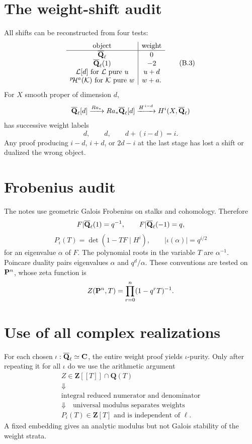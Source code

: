\section{The weight-shift audit}

All shifts can be reconstructed from four tests:
\[
\begin{array}{c|c}
\text{object}&\text{weight}\\
\hline
\overline{\mathbf Q}_\ell&0\\
\overline{\mathbf Q}_\ell(1)&-2\\
\mathcal L[d]\text{ for \(\mathcal L\) pure \(u\)}&u+d\\
{}^{p}\!\mathcal H^a(\mathcal K)\text{ for \(\mathcal K\) pure \(w\)}&w+a.
\end{array}
\tag{B.3}\label{eq:weight-shift-audit}
\]
For \(X\) smooth proper of dimension \(d\),
\[
  \overline{\mathbf Q}_\ell[d]\xrightarrow{Ra_*}
  Ra_*\overline{\mathbf Q}_\ell[d]
\xrightarrow{H^{\,i-d}}
  H^i(X,\overline{\mathbf Q}_\ell)
\]
has successive weight labels
\[
  d,\qquad d,\qquad d+(i-d)=i.
\tag{B.4}\label{eq:terminal-shift-audit}
\]
Any proof producing \(i-d\), \(i+d\), or \(2d-i\) at the last stage has lost a
shift or dualized the wrong object.

\section{Frobenius audit}

The notes use geometric Galois Frobenius on stalks and cohomology.  Therefore
\[
 F|\overline{\mathbf Q}_\ell(1)=q^{-1},\qquad F|\overline{\mathbf Q}_\ell(-1)=q,
\]
\[
 P_i(T)=\det(1-TF\mid H^i),\qquad
 |\iota(\alpha)|=q^{i/2}
\]
for an eigenvalue \(\alpha\) of \(F\).  The polynomial roots in the variable
\(T\) are \(\alpha^{-1}\).  Poincare duality pairs eigenvalues
\(\alpha\) and \(q^d/\alpha\).  These conventions are tested on
\(\mathbf P^n\), whose zeta function is
\[
  Z(\mathbf P^n,T)=\prod_{r=0}^{n}(1-q^rT)^{-1}.
\]

\section{Use of all complex realizations}

For each chosen
\(\iota:\overline{\mathbf Q}_\ell\simeq\mathbf C\), the entire weight proof yields
\(\iota\)-purity.  Only after repeating it for all \(\iota\) do we use the
arithmetic argument
\[
\begin{gathered}
Z\in\mathbf Z[[T]]\cap\mathbf Q(T)\\
\Downarrow\\
\text{integral reduced numerator and denominator}\\
\Downarrow\quad\text{universal modulus separates weights}\\
P_i(T)\in\mathbf Z[T]\text{ and is independent of }\ell.
\end{gathered}
\]
A fixed embedding gives an analytic modulus but not Galois stability of the
weight strata.

